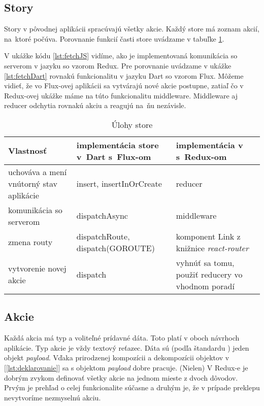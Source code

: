 \subsection{Story}
Story v pôvodnej aplikácii spracúvajú všetky akcie. Každý store má zoznam akcií, na~ktoré počúva. Porovnanie funkcií časti store uvádzame v tabuľke \ref{table:store}.

V ukážke kódu \ref{lst:fetchJS} vidíme, ako je implementovaná komunikácia so serverom v jazyku \JS{} so vzorom Redux. Pre porovnanie uvádzame v ukážke \ref{lst:fetchDart} rovnakú funkcionalitu v jazyku Dart so vzorom Flux. Môžeme vidieť, že vo Flux-ovej aplikácii sa vytvárajú nové akcie postupne, zatiaľ čo v Redux-ovej ukážke máme na túto funkcionalitu middleware.%
Middleware aj reducer odchytia rovnakú akciu a reagujú na~ňu nezávisle.

\begin{table}
  \caption{Úlohy store}
  \label{table:store}
  \begin{tabular}{| p{4cm} | p{5cm} | p{5cm} |}
   \hline         %
     Vlastnosť & implementácia store v~Dart s~Flux-om & implementácia v~\JS{} s~Redux-om \\
    \hline
    \hline
     uchováva a mení vnútorný stav aplikácie & 
     insert, insertInOrCreate &
     reducer \\
    \hline
     komunikácia so serverom & 
     dispatchAsync & 
     middleware \\
    \hline
     zmena routy & 
     dispatchRoute, dispatch(GOROUTE) & 
     komponent Link z knižnice \emph{react-router} \\
    \hline
     vytvorenie novej akcie & 
     dispatch & 
     vyhnúť sa tomu, použiť reducery vo vhodnom poradí \\%
    \hline
   \end{tabular}
\end{table}



\subsection{Akcie}
Každá akcia má typ a voliteľné prídavné dáta. %
Toto platí v oboch návrhoch aplikácie. Typ akcie je vždy textový reťazec. Dáta sú (podľa štandardu \cite{fluxStAction}) jeden objekt \emph{payload}. 
Vďaka prirodzenej kompozícii a dekompozícii objektov v \JS{} [\ref{lst:deklarovanie}] sa s objektom \emph{payload} dobre pracuje. 
(Nielen) V Redux-e je dobrým zvykom definovať všetky akcie na jednom mieste z dvoch dôvodov. Prvým je prehľad o celej funkcionalite súčasne a druhým je, že v prípade preklepu nevytvoríme nezmyselnú akciu.

